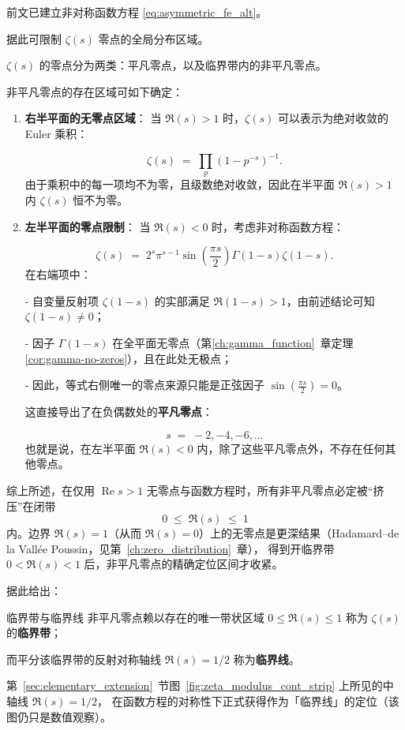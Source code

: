 前文已建立非对称函数方程 \eqref{eq:asymmetric_fe_alt}。

据此可限制 $\zeta(s)$ 零点的全局分布区域。

$\zeta(s)$ 的零点分为两类：平凡零点，以及临界带内的非平凡零点。

非平凡零点的存在区域可如下确定：
\begin{enumerate}
    \item \textbf{右半平面的无零点区域}：
    当 $\Re(s) > 1$ 时，$\zeta(s)$ 可以表示为绝对收敛的 Euler 乘积：

    \[
      \zeta(s) \;=\; \prod_{p} \left(1 - p^{-s}\right)^{-1}.
    \]
    由于乘积中的每一项均不为零，且级数绝对收敛，因此在半平面 $\Re(s)>1$ 内 $\zeta(s)$ 恒不为零。

    \item \textbf{左半平面的零点限制}：
    当 $\Re(s) < 0$ 时，考虑非对称函数方程：

    \[
      \zeta(s) \;=\; 2^s \pi^{s-1} \sin\left(\frac{\pi s}{2}\right) \Gamma(1-s) \zeta(1-s).
    \]
    在右端项中：

    - 自变量反射项 $\zeta(1-s)$ 的实部满足 $\Re(1-s) > 1$，由前述结论可知 $\zeta(1-s) \neq 0$；

    - 因子 $\Gamma(1-s)$ 在全平面无零点（第\ref{ch:gamma_function}~章定理\ref{cor:gamma-no-zeros}），且在此处无极点；

    - 因此，等式右侧唯一的零点来源只能是正弦因子 $\sin\left(\frac{\pi s}{2}\right) = 0$。

    这直接导出了在负偶数处的\textbf{平凡零点}：

    \[
      s \;=\; -2, -4, -6, \dots
    \]
    也就是说，在左半平面 $\Re(s)<0$ 内，除了这些平凡零点外，不存在任何其他零点。
\end{enumerate}

综上所述，在仅用 $\operatorname{Re}s>1$ 无零点与函数方程时，所有非平凡零点必定被“挤压”在闭带
\[
  0 \;\leq\; \Re(s) \;\leq\; 1
\]
内。边界 $\Re(s)=1$（从而 $\Re(s)=0$）上的无零点是更深结果（Hadamard--de la Vallée Poussin，见第~\ref{ch:zero_distribution}~章），
得到开临界带 $0<\Re(s)<1$ 后，非平凡零点的精确定位区间才收紧。

据此给出：
\begin{definition}{临界带与临界线}{}
非平凡零点赖以存在的唯一带状区域 $0 \le \Re(s) \le 1$ 称为 $\zeta(s)$ 的\textbf{临界带}；

而平分该临界带的反射对称轴线 $\Re(s)=1/2$ 称为\textbf{临界线}。
\end{definition}

第~\ref{sec:elementary_extension}~节图~\ref{fig:zeta_modulus_cont_strip} 上所见的中轴线 $\Re(s)=1/2$，
在函数方程的对称性下正式获得作为「临界线」的定位（该图仍只是数值观察）。

